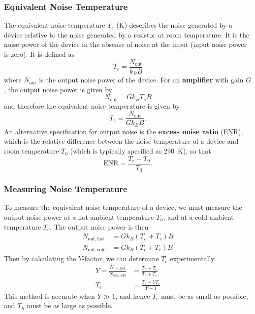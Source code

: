 \documentclass{article}
\begin{document}
\subsubsection{Equivalent Noise Temperature}
The equivalent noise temperature \(T_e\) (\unit{K}) describes the noise
generated by a device relative to the noise generated by a resistor at
room temperature. It is the noise power of the device in the absense of
noise at the input (input noise power is zero). It is defined as
\begin{equation*}
    T_e = \frac{N_\mathrm{out}}{k_B B}
\end{equation*}
where \(N_\mathrm{out}\) is the output noise power of the device. For an \textbf{amplifier}
with gain \(G\), the output noise power is given by
\begin{equation*}
    N_\mathrm{out} = G k_B T_e B
\end{equation*}
and therefore the equivalent noise temperature is given by
\begin{equation*}
    T_e = \frac{N_\mathrm{out}}{G k_B B}.
\end{equation*}
An alternative specification for output noise is the \textbf{excess
    noise ratio} (ENR), which is the relative difference between the noise
temperature of a device and room temperature \(T_0\) (which is typically
specified as \qty{290}{K}), so that
\begin{equation*}
    \mathrm{ENR} = \frac{T_e - T_0}{T_0}.
\end{equation*}
\subsubsection{Measuring Noise Temperature}
To measure the equivalent noise temperature of a device, we must
measure the output noise power at a hot ambient temperature \(T_h\),
and at a cold ambient temperature \(T_c\). The output noise power is
then
\begin{align*}
    N_{\mathrm{out,hot}}  & = G k_B \left( T_h + T_e \right) B \\
    N_{\mathrm{out,cold}} & = G k_B \left( T_c + T_e \right) B
\end{align*}
Then by calculating the \(Y\)-factor, we can determine \(T_e\)
experimentally.
\begin{align*}
    Y = \frac{N_{\mathrm{out,hot}}}{N_{\mathrm{out,cold}}} & = \frac{T_h + T_e}{T_c + T_e} \\
    T_e                                                    & = \frac{T_h - Y T_c}{Y - 1}
\end{align*}
This method is accurate when \(Y \gg 1\), and hence \(T_c\) must be as
small as possible, and \(T_h\) must be as large as possible.
\end{document}
